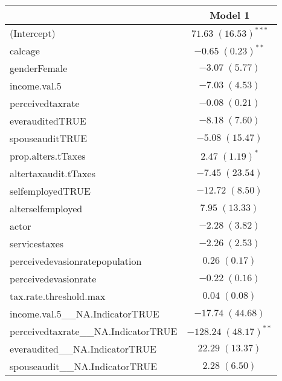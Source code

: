 
\begin{table}
\begin{tabular}{l c }
\hline
 & Model 1 \\
\hline
(Intercept)                                        & $71.63 \; (16.53)^{***}$  \\
calcage                                            & $-0.65 \; (0.23)^{**}$    \\
genderFemale                                       & $-3.07 \; (5.77)$         \\
income.val.5                                       & $-7.03 \; (4.53)$         \\
perceivedtaxrate                                   & $-0.08 \; (0.21)$         \\
everauditedTRUE                                    & $-8.18 \; (7.60)$         \\
spouseauditTRUE                                    & $-5.08 \; (15.47)$        \\
prop.alters.tTaxes                                 & $2.47 \; (1.19)^{*}$      \\
altertaxaudit.tTaxes                               & $-7.45 \; (23.54)$        \\
selfemployedTRUE                                   & $-12.72 \; (8.50)$        \\
alterselfemployed                                  & $7.95 \; (13.33)$         \\
actor                                              & $-2.28 \; (3.82)$         \\
servicestaxes                                      & $-2.26 \; (2.53)$         \\
perceivedevasionratepopulation                     & $0.26 \; (0.17)$          \\
perceivedevasionrate                               & $-0.22 \; (0.16)$         \\
tax.rate.threshold.max                             & $0.04 \; (0.08)$          \\
income.val.5\_\_NA.IndicatorTRUE                   & $-17.74 \; (44.68)$       \\
perceivedtaxrate\_\_NA.IndicatorTRUE               & $-128.24 \; (48.17)^{**}$ \\
everaudited\_\_NA.IndicatorTRUE                    & $22.29 \; (13.37)$        \\
spouseaudit\_\_NA.IndicatorTRUE                    & $2.28 \; (6.50)$          \\

\end{tabular}
\end{table}
